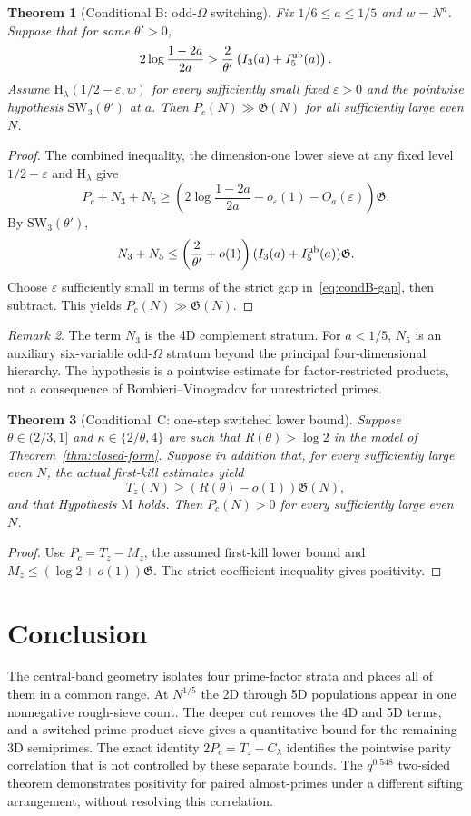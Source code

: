 \documentclass[final,11pt]{elsarticle}
\newtheorem{theorem}{Theorem}[section]
\theoremstyle{definition}
\theoremstyle{remark}
\newtheorem{remark}[theorem]{Remark}
\newcommand{\GG}{\mathfrak{G}}
\numberwithin{equation}{section}
\begin{document}
\begin{theorem}[Conditional B: odd-$\Omega$ switching]\label{thm:condB}
Fix $1/6\le a\le1/5$ and $w=N^a$. Suppose that for some $\theta'>0$,
\begin{equation}\label{eq:condB-gap}
2\log\frac{1-2a}{2a}>\frac2{\theta'}\left(I_3(a)+I_5^{\rm ub}(a)\right).
\end{equation}
Assume $\mathrm H_\lambda(1/2-\varepsilon,w)$ for every sufficiently small fixed $\varepsilon>0$ and the pointwise hypothesis $\mathrm{SW}_3(\theta')$ at $a$. Then $P_c(N)\gg\GG(N)$ for all sufficiently large even $N$.
\end{theorem}
\begin{proof}
The combined inequality, the dimension-one lower sieve at any fixed level $1/2-\varepsilon$ and $\mathrm H_\lambda$ give
\[
P_c+N_3+N_5\ge\left(2\log\frac{1-2a}{2a}-o_\varepsilon(1)-O_a(\varepsilon)\right)\GG.
\]
By $\mathrm{SW}_3(\theta')$,
\[
N_3+N_5\le\left(\frac2{\theta'}+o(1)\right)(I_3(a)+I_5^{\rm ub}(a))\GG.
\]
Choose $\varepsilon$ sufficiently small in terms of the strict gap in~\eqref{eq:condB-gap}, then subtract. This yields $P_c(N)\gg\GG(N)$.
\end{proof}
\begin{remark}
The term $N_3$ is the 4D complement stratum. For $a<1/5$, $N_5$ is an auxiliary six-variable odd-$\Omega$ stratum beyond the principal four-dimensional hierarchy. The hypothesis is a pointwise estimate for factor-restricted products, not a consequence of Bombieri--Vinogradov for unrestricted primes.
\end{remark}

\begin{theorem}[Conditional~C: one-step switched lower bound]\label{thm:condC}
Suppose $\theta\in(2/3,1]$ and $\kappa\in\{2/\theta,4\}$ are such that $R(\theta)>\log2$ in the model of Theorem~\ref{thm:closed-form}. Suppose in addition that, for every sufficiently large even $N$, the \emph{actual} first-kill estimates yield
\[
T_z(N)\ge(R(\theta)-o(1))\GG(N),
\]
and that Hypothesis $\mathrm M$ holds. Then $P_c(N)>0$ for every sufficiently large even $N$.
\end{theorem}
\begin{proof}
Use $P_c=T_z-M_z$, the assumed first-kill lower bound and $M_z\le(\log2+o(1))\GG$. The strict coefficient inequality gives positivity.
\end{proof}

\section{Conclusion}\label{sec:conclusion}
The central-band geometry isolates four prime-factor strata and places all of them in a common range. At $N^{1/5}$ the 2D through 5D populations appear in one nonnegative rough-sieve count. The deeper cut removes the 4D and 5D terms, and a switched prime-product sieve gives a quantitative bound for the remaining 3D semiprimes. The exact identity $2P_c=T_z-C_\lambda$ identifies the pointwise parity correlation that is not controlled by these separate bounds. The $q^{0.548}$ two-sided theorem demonstrates positivity for paired almost-primes under a different sifting arrangement, without resolving this correlation.
\end{document}
